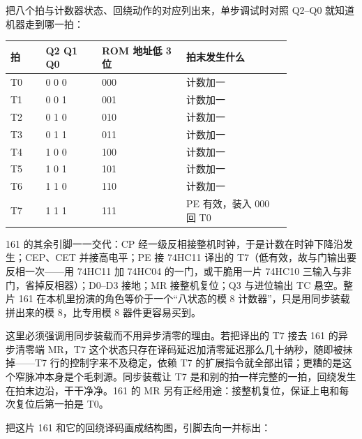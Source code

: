 把八个拍与计数器状态、回绕动作的对应列出来，单步调试时对照 Q2–Q0 就知道机器走到哪一拍：

\begin{longtable}{L{0.10\linewidth}L{0.16\linewidth}L{0.24\linewidth}L{0.30\linewidth}}
\toprule
拍 & Q2 Q1 Q0 & ROM 地址低 3 位 & 拍末发生什么 \\
\midrule
T0 & 0 0 0 & 000 & 计数加一 \\
T1 & 0 0 1 & 001 & 计数加一 \\
T2 & 0 1 0 & 010 & 计数加一 \\
T3 & 0 1 1 & 011 & 计数加一 \\
T4 & 1 0 0 & 100 & 计数加一 \\
T5 & 1 0 1 & 101 & 计数加一 \\
T6 & 1 1 0 & 110 & 计数加一 \\
T7 & 1 1 1 & 111 & PE 有效，装入 000 回 T0 \\
\bottomrule
\end{longtable}

161 的其余引脚一一交代：CP 经一级反相接整机时钟，于是计数在时钟下降沿发生；CEP、CET 并接高电平；PE 接 74HC11 译出的 T7（低有效，故与门输出要反相一次——用 74HC11 加 74HC04 的一门，或干脆用一片 74HC10 三输入与非门，省掉反相器）；D0–D3 接地；MR 接整机复位；Q3 与进位输出 TC 悬空。整片 161 在本机里扮演的角色等价于一个“八状态的模 8 计数器”，只是用同步装载拼出来的模 8，比专用模 8 器件更容易买到。

这里必须强调用同步装载而不用异步清零的理由。若把译出的 T7 接去 161 的异步清零端 MR，T7 这个状态只存在译码延迟加清零延迟那么几十纳秒，随即被抹掉——T7 行的控制字来不及稳定，依赖 T7 的扩展指令就全部出错；更糟的是这个窄脉冲本身是个毛刺源。同步装载让 T7 是和别的拍一样完整的一拍，回绕发生在拍末边沿，干干净净。161 的 MR 另有正经用途：接整机复位，保证上电和每次复位后第一拍是 T0。

把这片 161 和它的回绕译码画成结构图，引脚去向一并标出：

